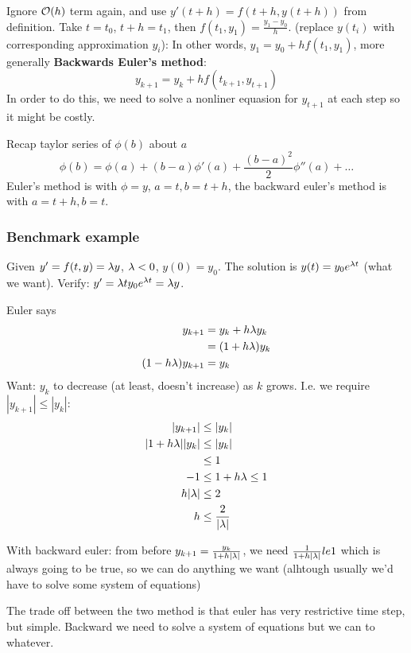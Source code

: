 Ignore $\mathcal{O}(h)$ term again, and use $y'(t+h) = f(t+h, y(t+h))$ from
definition. Take $t=t_0$, $t+h = t_1$, then $f(t_1, y_1) =
\frac{y_1-y_0}{h}$. (replace $y(t_i)$ with corresponding approximation $y_i$):
In other words, $y_1 = y_0 + hf(t_1,y_1)$, more generally
\textbf{Backwards Euler's method}: $$y_{k+1}
= y_k + hf(t_{k+1},y_{t+1})$$
In order to do this, we need to solve a nonliner equasion for
$y_{t+1}$ at each step so it might be costly.

Recap taylor series of $\phi(b)$ about $a$
$$\phi(b) = \phi(a) + (b-a)\phi'(a) + \frac{(b-a)^2}{2}\phi''(a) +
\dots$$
Euler's method is with $\phi=y$, $a = t, b=t+h$, the backward euler's
method is with $a=t+h,b=t$.

\subsubsection{Benchmark example}
Given $y' = f(t,y) = \lambda y$, $\lambda < 0$, $y(0)=y_0$. The solution is $y(t) = y_0e^{\lambda t}$ (what we want). Verify:
$y' = \lambda t y_0e^{\lambda t} = \lambda y$.

Euler says 
\begin{align*}
y_{k+1} &= y_k + h \lambda y_k  \\
&= (1+h\lambda) y_k\\
(1-h\lambda)y_{k+1} &= y_k
\end{align*}
Want: $y_k$ to decrease (at least, doesn't increase) as $k$ grows.
I.e. we require $|y_{k+1}| \le |y_k|$:
\begin{align*}
  |y_{k+1}| &\le |y_k|\\
|1+h\lambda||y_k| &\le |y_k|\\
&\le 1\\
-1 &\le 1+h\lambda \le 1\\
h|\lambda| &\le 2\\
h &\le \frac{2}{|\lambda|}
\end{align*}

With backward euler:
from before $y_{k+1} = \frac{y_k}{1+h|\lambda|}$, we need
$\frac{1}{1+h|\lambda|} le 1$ which is always going to be true, so we can
do anything we want (alhtough usually we'd have to solve some system
of equations)

The trade off between the two method is that euler has very
restrictive time step, but simple. Backward we need to solve a system
of equations but we can to whatever.

